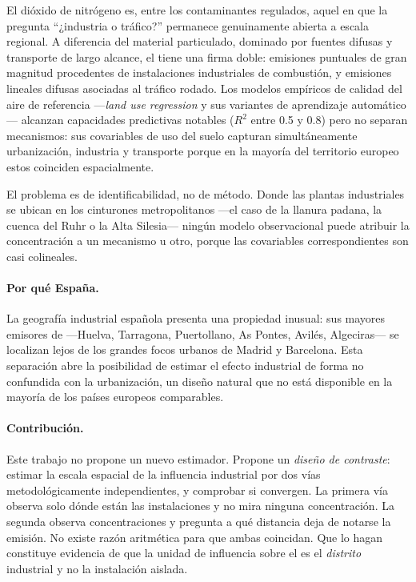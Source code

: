 \documentclass[10pt,twocolumn,a4paper]{article}
\begin{document}
El dióxido de nitrógeno es, entre los contaminantes regulados, aquel en que la
pregunta ``¿industria o tráfico?'' permanece genuinamente abierta a escala
regional. A diferencia del material particulado, dominado por fuentes difusas
y transporte de largo alcance, el  tiene una firma doble: emisiones
puntuales de gran magnitud procedentes de instalaciones industriales de
combustión, y emisiones lineales difusas asociadas al tráfico rodado. Los
modelos empíricos de calidad del aire de referencia
---\emph{land use regression} y sus variantes de aprendizaje
automático \citep{beelen2013,chen2019,vizcaino2018}--- alcanzan capacidades
predictivas notables ($R^2$ entre \num{0.5} y \num{0.8}) pero no separan
mecanismos: sus covariables de uso del suelo capturan simultáneamente
urbanización, industria y transporte porque en la mayoría del territorio
europeo estos coinciden espacialmente.

El problema es de identificabilidad, no de método. Donde las plantas
industriales se ubican en los cinturones metropolitanos ---el caso de la
llanura padana, la cuenca del Ruhr o la Alta Silesia--- ningún modelo
observacional puede atribuir la concentración a un mecanismo u otro, porque
las covariables correspondientes son casi colineales.

\paragraph{Por qué España.} La geografía industrial española presenta una
propiedad inusual: sus mayores emisores de  ---Huelva, Tarragona,
Puertollano, As Pontes, Avilés, Algeciras--- se localizan lejos de los grandes
focos urbanos de Madrid y Barcelona. Esta separación abre la posibilidad de
estimar el efecto industrial de forma no confundida con la urbanización, un
diseño natural que no está disponible en la mayoría de los países europeos
comparables.

\paragraph{Contribución.} Este trabajo no propone un nuevo estimador. Propone
un \emph{diseño de contraste}: estimar la escala espacial de la influencia
industrial por dos vías metodológicamente independientes, y comprobar si
convergen. La primera vía observa solo dónde están las instalaciones y no mira
ninguna concentración. La segunda observa concentraciones y pregunta a qué
distancia deja de notarse la emisión. No existe razón aritmética para que
ambas coincidan. Que lo hagan constituye evidencia de que la unidad de
influencia sobre el  es el \emph{distrito} industrial y no la
instalación aislada.
\end{document}
